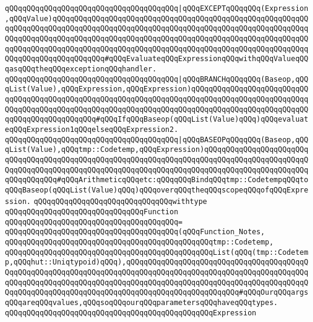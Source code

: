 \verb|qQQqqQQqqQQqqQQqqQQqqQQqqQQqqQQqqQQqqQQq|\verb#|qQQqEXCEPTqQQqqQQq(Expression,qQQqValue)qQQqqQQqqQQqqQQqqQQqqQQqqQQqqQQqqQQqqQQqqQQqqQQqqQQqqQQqqQQqqQQqqQQqqQQqqQQqqQQqqQQqqQQqqQQqqQQqqQQqqQQqqQQqqQQqqQQqqQQqqQQqqQQqqQQqqQQqqQQqqQQqqQQqqQQqqQQqqQQqqQQqqQQqqQQqqQQqqQQqqQQqqQQqqQQqqQQqqQQqqQQqqQQqqQQqqQQqqQQqqQQqqQQqqQQqqQQqqQQqqQQqqQQqqQQqqQQqqQQqqQQqqQQqqQQqqQQqqQQqqQQqqQQqqQQq#\verb|#qQQqEvaluateqQQqExpressionqQQqwithqQQqValueqQQqasqQQqtheqQQqexceptionqQQqhandler.|\newline
\newline
\verb|qQQqqQQqqQQqqQQqqQQqqQQqqQQqqQQqqQQqqQQq|\verb#|qQQqBRANCHqQQqqQQq(Baseop,qQQqList(Value),qQQqExpression,qQQqExpression)qQQqqQQqqQQqqQQqqQQqqQQqqQQqqQQqqQQqqQQqqQQqqQQqqQQqqQQqqQQqqQQqqQQqqQQqqQQqqQQqqQQqqQQqqQQqqQQqqQQqqQQqqQQqqQQqqQQqqQQqqQQqqQQqqQQqqQQqqQQqqQQqqQQqqQQqqQQqqQQqqQQqqQQqqQQqqQQqqQQqqQQqqQQq#\verb|#qQQqIfqQQqBaseop(qQQqList(Value)qQQq)qQQqevaluateqQQqExpression1qQQqelseqQQqExpression2.|\newline
\verb|qQQqqQQqqQQqqQQqqQQqqQQqqQQqqQQqqQQqqQQq|\verb#|qQQqBASEOPqQQqqQQq(Baseop,qQQqList(Value),qQQqtmp::Codetemp,qQQqExpression)qQQqqQQqqQQqqQQqqQQqqQQqqQQqqQQqqQQqqQQqqQQqqQQqqQQqqQQqqQQqqQQqqQQqqQQqqQQqqQQqqQQqqQQqqQQqqQQqqQQqqQQqqQQqqQQqqQQqqQQqqQQqqQQqqQQqqQQqqQQqqQQqqQQqqQQqqQQqqQQqqQQqqQQqqQQqqQQq#\verb|#qQQqArithmeticqQQqetc:qQQqqQQqBindqQQqtmp::CodetempqQQqtoqQQqBaseop(qQQqList(Value)qQQq)qQQqoverqQQqtheqQQqscopeqQQqofqQQqExpression.|\newline
\newline
\verb|qQQqqQQqqQQqqQQqqQQqqQQqqQQqqQQqwithtype|\newline
\verb|qQQqqQQqqQQqqQQqqQQqqQQqqQQqqQQqFunction|\newline
\verb|qQQqqQQqqQQqqQQqqQQqqQQqqQQqqQQqqQQqqQQq=|\newline
\verb|qQQqqQQqqQQqqQQqqQQqqQQqqQQqqQQqqQQqqQQq(qQQqFunction_Notes,|\newline
\verb|qQQqqQQqqQQqqQQqqQQqqQQqqQQqqQQqqQQqqQQqqQQqqQQqtmp::Codetemp,|\newline
\verb|qQQqqQQqqQQqqQQqqQQqqQQqqQQqqQQqqQQqqQQqqQQqqQQqList(qQQq(tmp::Codetemp,qQQqhut::Uniqtypoid)qQQq),qQQqqQQqqQQqqQQqqQQqqQQqqQQqqQQqqQQqqQQqqQQqqQQqqQQqqQQqqQQqqQQqqQQqqQQqqQQqqQQqqQQqqQQqqQQqqQQqqQQqqQQqqQQqqQQqqQQqqQQqqQQqqQQqqQQqqQQqqQQqqQQqqQQqqQQqqQQqqQQqqQQqqQQqqQQqqQQqqQQqqQQqqQQqqQQqqQQqqQQqqQQqqQQqqQQqqQQqqQQqqQQqqQQqqQQqqQQq#qQQqOurqQQqargsqQQqareqQQqvalues,qQQqsoqQQqourqQQqparametersqQQqhaveqQQqtypes.|\newline
\verb|qQQqqQQqqQQqqQQqqQQqqQQqqQQqqQQqqQQqqQQqqQQqqQQqExpression|\newline

